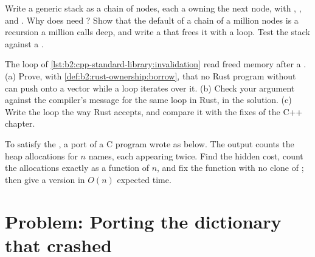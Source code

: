 \begin{exercise}[$\star\star\star$]\label{exo:b2:rust-ownership:10}
Write a generic stack  as a chain of nodes, each a  owning the next node, with
, ,  and . Why does  need ? Show that
the default  of a chain of a million nodes is a recursion a million calls deep, and write a  that
frees it with a loop. Test the stack against a .
\end{exercise}

\begin{exercise}[$\star\star\star$]\label{exo:b2:rust-ownership:11}
The loop of \cref{lst:b2:cpp-standard-library:invalidation} read freed memory after a . (a) Prove,
with \cref{def:b2:rust-ownership:borrow}, that no Rust program without  can push onto a vector while a
loop iterates over it. (b) Check your argument against the compiler's message for the same loop in Rust, in the
solution. (c) Write the loop the way Rust accepts, and compare it with the fixes of the C++ chapter.
\end{exercise}

\begin{exercise}[$\star\star\star$]\label{exo:b2:rust-ownership:12}
To satisfy the , a port of a C program wrote  as below. The output counts the heap
allocations for $n$ names, each appearing twice. Find the hidden cost, count the allocations exactly as a function of
$n$, and fix the function with no clone of ; then give a version in $O(n)$ expected time.
\end{exercise}

\section{Problem: Porting the dictionary that crashed}\label{sec:b2:rust-ownership:problem}

